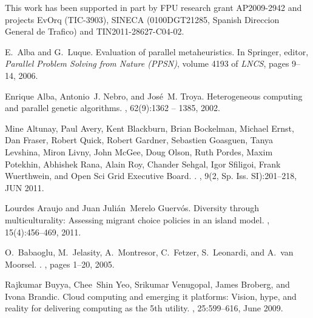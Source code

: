 \begin{acknowledgements}
This work has been supported in part by FPU research grant AP2009-2942 and projects EvOrq (TIC-3903), SINECA (0100DGT21285, Spanish Direccion General de Trafico) and TIN2011-28627-C04-02.
\end{acknowledgements}

% 

\begin{thebibliography}{10}

E.~Alba and G.~Luque.
\newblock Evaluation of parallel metaheuristics.
\newblock In Springer, editor, {\em Parallel Problem Solving from Nature
  (PPSN)}, volume 4193 of {\em LNCS}, pages 9--14, 2006.

Enrique Alba, Antonio~J. Nebro, and Jos\'e~M. Troya.
\newblock Heterogeneous computing and parallel genetic algorithms.
, 62(9):1362 --
  1385, 2002.

Mine Altunay, Paul Avery, Kent Blackburn, Brian Bockelman, Michael Ernst, Dan
  Fraser, Robert Quick, Robert Gardner, Sebastien Goasguen, Tanya Levshina,
  Miron Livny, John McGee, Doug Olson, Ruth Pordes, Maxim Potekhin, Abhishek
  Rana, Alain Roy, Chander Sehgal, Igor Sfiligoi, Frank Wuerthwein, and {Open
  Sci Grid Executive Board}.
.
, {9}({2, Sp. Iss. SI}):{201--218},
  {JUN} 2011.

Lourdes Araujo and Juan Juli{\'a}n~Merelo Guerv{\'o}s.
\newblock Diversity through multiculturality: Assessing migrant choice policies
  in an island model.
, 15(4):456--469, 2011.

O.~Babaoglu, M.~Jelasity, A.~Montresor, C.~Fetzer, S.~Leonardi, and A.~van
  Moorsel.
.
, pages
  1--20, 2005.

Rajkumar Buyya, Chee~Shin Yeo, Srikumar Venugopal, James Broberg, and Ivona
  Brandic.
\newblock Cloud computing and emerging it platforms: Vision, hype, and reality
  for delivering computing as the 5th utility.
, 25:599--616, June 2009.


\end{thebibliography}
